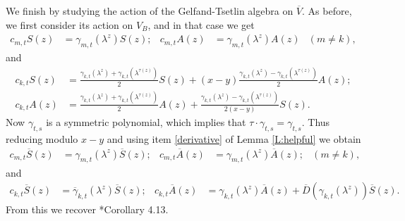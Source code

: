 \documentclass[11pt,fleqn]{article}
\begin{document}
We finish by studying the action of the Gelfand-Tsetlin algebra on $\overline 
V$. As before, we first consider its action on $V_B$, and in that case we get
\begin{align*}
c_{m,t} S(z)
	&= \gamma_{m,t}(\lambda^z)S(z); 
&c_{m,t} A(z)
	&= \gamma_{m,t}(\lambda^z)A(z) 
	&(m \neq k),
\end{align*}
and
\begin{align*}
c_{k,t} S(z)
	&= \frac{\gamma_{k,t}(\lambda^z) + \gamma_{k,t}(\lambda^{\tau(z)})}{2} S(z)
		+ (x-y)\frac{\gamma_{k,t}(\lambda^z) - \gamma_{k,t}(\lambda^{\tau(z)})}
		{2}A(z); \\
c_{k,t} A(z)
	&= \frac{\gamma_{k,t}(\lambda^z) + \gamma_{k,t}(\lambda^{\tau(z)})}{2}A(z)
		+ \frac{\gamma_{k,t}(\lambda^z) - \gamma_{k,t}(\lambda^{\tau(z)})}
		{2(x-y)}S(z).
\end{align*}
Now $\gamma_{t,s}$ is a symmetric polynomial, which implies that $\tau \cdot 
\gamma_{t,s} = \gamma_{t,s}$. Thus reducing modulo $x-y$ and using item 
\ref{derivative} of Lemma \ref{L:helpful} we obtain
\begin{align*}
c_{m,t} \overline S(z)
	&= \gamma_{m,t}(\lambda^z) \overline S(z);
&c_{m,t} \overline A(z)
	&= \gamma_{m,t}(\lambda^z) \overline A(z); 
	&(m \neq k),
\end{align*}
and
\begin{align*}
c_{k,t} \overline S(z)
	&= \overline \gamma_{k,t}(\lambda^z) \overline S(z); 
&c_{k,t} \overline A(z)
	&= \gamma_{k,t}(\lambda^z) \overline A(z)
		+ \overline D(\gamma_{k,t}(\lambda^z)) \overline S(z).
\end{align*}
From this we recover \cite{FGR-singular-gt}*{Corollary 4.13}. 
\end{document}
